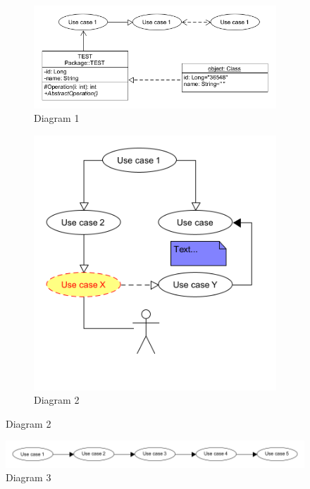 \documentclass[10pt,twocolumn,twoside,slovak,a4paper]{article}
\begin{document}
\begin{figure}
 \centering
\begin{subfigure} {.5\textwidth}
  \includegraphics[width=\linewidth]{diag1.png}
  \caption{Diagram 1}
\end{subfigure}%
\begin{subfigure} {.5\textwidth}
  \includegraphics[width=\linewidth]{diag2.png}
  \caption{Diagram 2}
\end{subfigure}
\end{figure}

\begin{figure}
  \includegraphics[width=\textwidth]{diag3.png}
  \caption[width=\textwidth]{Diagram 3}
\end{figure}
\end{document}
